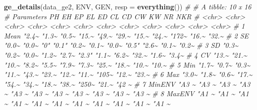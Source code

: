 \documentclass[
]{book}
\newenvironment{Shaded}{\begin{snugshade}}{\end{snugshade}}
\newcommand{\CommentTok}[1]{\textcolor[rgb]{0.56,0.35,0.01}{\textit{#1}}}
\newcommand{\DataTypeTok}[1]{\textcolor[rgb]{0.13,0.29,0.53}{#1}}
\newcommand{\KeywordTok}[1]{\textcolor[rgb]{0.13,0.29,0.53}{\textbf{#1}}}
\newcommand{\NormalTok}[1]{#1}
\numberwithin{equation}{section}
\begin{document}
\begin{Shaded}
\begin{Highlighting}[]
\KeywordTok{ge\_details}\NormalTok{(data\_ge2, ENV, GEN, }\DataTypeTok{resp =} \KeywordTok{everything}\NormalTok{())}
\CommentTok{\# \# A tibble: 10 x 16}
\CommentTok{\#    Parameters PH    EH    EP    EL    ED    CL    CD    CW    KW    NR    NKR  }
\CommentTok{\#    \textless{}chr\textgreater{}      \textless{}chr\textgreater{} \textless{}chr\textgreater{} \textless{}chr\textgreater{} \textless{}chr\textgreater{} \textless{}chr\textgreater{} \textless{}chr\textgreater{} \textless{}chr\textgreater{} \textless{}chr\textgreater{} \textless{}chr\textgreater{} \textless{}chr\textgreater{} \textless{}chr\textgreater{}}
\CommentTok{\#  1 Mean       "2.4\textasciitilde{} "1.3\textasciitilde{} "0.5\textasciitilde{} "15.\textasciitilde{} "49.\textasciitilde{} "29.\textasciitilde{} "15.\textasciitilde{} "24.\textasciitilde{} "172\textasciitilde{} "16.\textasciitilde{} "32.\textasciitilde{}}
\CommentTok{\#  2 SE         "0.0\textasciitilde{} "0.0\textasciitilde{} "0"   "0.1" "0.2\textasciitilde{} "0.1\textasciitilde{} "0.0\textasciitilde{} "0.5" "2.6\textasciitilde{} "0.1\textasciitilde{} "0.2\textasciitilde{}}
\CommentTok{\#  3 SD         "0.3\textasciitilde{} "0.2\textasciitilde{} "0.0\textasciitilde{} "1.2\textasciitilde{} "2.7\textasciitilde{} "2.3" "1.1\textasciitilde{} "6.2\textasciitilde{} "32.\textasciitilde{} "1.6\textasciitilde{} "3.4\textasciitilde{}}
\CommentTok{\#  4 CV         "13.\textasciitilde{} "21.\textasciitilde{} "10.\textasciitilde{} "8.2\textasciitilde{} "5.5\textasciitilde{} "7.9\textasciitilde{} "7.3\textasciitilde{} "25.\textasciitilde{} "18.\textasciitilde{} "10.\textasciitilde{} "10.\textasciitilde{}}
\CommentTok{\#  5 Min        "1.7\textasciitilde{} "0.7\textasciitilde{} "0.3\textasciitilde{} "11.\textasciitilde{} "43.\textasciitilde{} "23.\textasciitilde{} "12.\textasciitilde{} "11.\textasciitilde{} "105\textasciitilde{} "12.\textasciitilde{} "23.\textasciitilde{}}
\CommentTok{\#  6 Max        "3.0\textasciitilde{} "1.8\textasciitilde{} "0.6\textasciitilde{} "17.\textasciitilde{} "54.\textasciitilde{} "34.\textasciitilde{} "18.\textasciitilde{} "38.\textasciitilde{} "250\textasciitilde{} "21.\textasciitilde{} "42 \textasciitilde{}}
\CommentTok{\#  7 MinENV     "A3 \textasciitilde{} "A3 \textasciitilde{} "A3 \textasciitilde{} "A3 \textasciitilde{} "A3 \textasciitilde{} "A3 \textasciitilde{} "A3 \textasciitilde{} "A3 \textasciitilde{} "A3 \textasciitilde{} "A3 \textasciitilde{} "A3 \textasciitilde{}}
\CommentTok{\#  8 MaxENV     "A1 \textasciitilde{} "A1 \textasciitilde{} "A1 \textasciitilde{} "A1 \textasciitilde{} "A1 \textasciitilde{} "A1 \textasciitilde{} "A1 \textasciitilde{} "A1 \textasciitilde{} "A1 \textasciitilde{} "A1 \textasciitilde{} "A1 \textasciitilde{}}

\end{Highlighting}
\end{Shaded}
\end{document}
